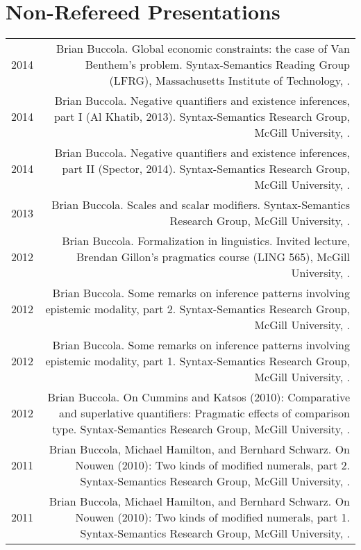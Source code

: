 \documentclass[a4paper]{article}
\makeatletter
\newcommand{\name}{Brian Buccola}
\newcommand{\myvrule}{\color{lightgray}\vrule width 1.0pt}
\newenvironment{cvsection}{%
  \renewcommand{\arraystretch}{1.75}
  \begin{longtable}[l]{@{} L R @{}}
}{%
  \end{longtable}
}
\makeatother
\begin{document}
\section*{Non-Refereed Presentations}

\begin{cvsection}
  2014 & \name. Global economic constraints: the case of Van Benthem's problem.
  Syntax-Semantics Reading Group (LFRG), Massachusetts Institute of Technology,
  . \\

  2014 & \name. Negative quantifiers and existence inferences, part I (Al
  Khatib, 2013). Syntax-Semantics Research Group, McGill University,
  . \\

  2014 & \name. Negative quantifiers and existence inferences, part II
  (Spector, 2014). Syntax-Semantics Research Group, McGill University,
  . \\

  2013 & \name. Scales and scalar modifiers. Syntax-Semantics Research Group,
  McGill University, . \\

  2012 & \name. Formalization in linguistics.  Invited lecture, Brendan
  Gillon's pragmatics course (LING 565), McGill University,
  . \\

  2012 & \name. Some remarks on inference patterns involving epistemic
  modality, part 2. Syntax-Semantics Research Group, McGill University,
  . \\

  2012 & \name. Some remarks on inference patterns involving epistemic
  modality, part 1. Syntax-Semantics Research Group, McGill University,
  . \\

  2012 & \name. On Cummins and Katsos (2010): Comparative and superlative
  quantifiers: Pragmatic effects of comparison type. Syntax-Semantics Research
  Group, McGill University, . \\

  2011 & \name, Michael Hamilton, and Bernhard Schwarz. On Nouwen (2010): Two
  kinds of modified numerals, part 2. Syntax-Semantics Research Group, McGill
  University, . \\

  2011 & \name, Michael Hamilton, and Bernhard Schwarz. On Nouwen (2010): Two
  kinds of modified numerals, part 1. Syntax-Semantics Research Group, McGill
  University, . \\
\end{cvsection}
\end{document}
